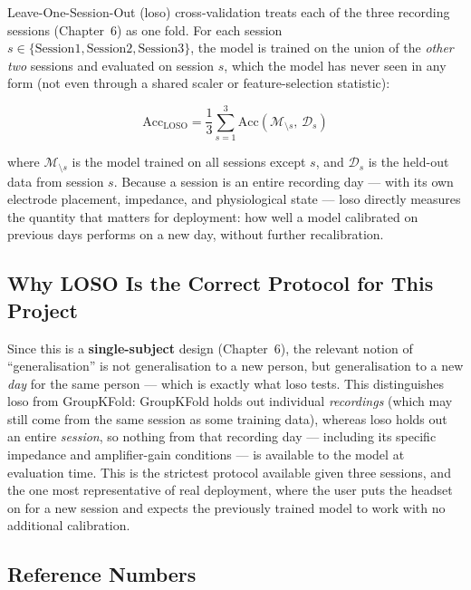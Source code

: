 Leave-One-Session-Out (\acrshort{loso}) cross-validation treats
each of the three recording sessions (Chapter~6) as one fold. For
each session $s \in \{\text{Session1}, \text{Session2},
\text{Session3}\}$, the model is trained on the union of the
\emph{other two} sessions and evaluated on session $s$, which the
model has never seen in any form (not even through a shared scaler
or feature-selection statistic):

\begin{equation}
\text{Acc}_{\text{LOSO}} = \frac{1}{3}\sum_{s=1}^{3}
\text{Acc}\!\left(\mathcal{M}_{\setminus s},\, \mathcal{D}_s\right)
\label{eq:loso}
\end{equation}

\noindent where $\mathcal{M}_{\setminus s}$ is the model trained on
all sessions except $s$, and $\mathcal{D}_s$ is the held-out data
from session $s$. Because a session is an entire recording day ---
with its own electrode placement, impedance, and physiological
state --- \acrshort{loso} directly measures the quantity that
matters for deployment: how well a model calibrated on previous
days performs on a new day, without further recalibration.

\subsection{Why LOSO Is the Correct Protocol for This Project}

Since this is a \textbf{single-subject} design (Chapter~6), the
relevant notion of ``generalisation'' is not generalisation to a
new person, but generalisation to a new \emph{day} for the same
person --- which is exactly what \acrshort{loso} tests. This
distinguishes \acrshort{loso} from GroupKFold: GroupKFold holds out
individual \emph{recordings} (which may still come from the same
session as some training data), whereas \acrshort{loso} holds out
an entire \emph{session}, so nothing from that recording day ---
including its specific impedance and amplifier-gain conditions ---
is available to the model at evaluation time. This is the strictest
protocol available given three sessions, and the one most
representative of real deployment, where the user puts the headset
on for a new session and expects the previously trained model to
work with no additional calibration.

\subsection{Reference Numbers}

